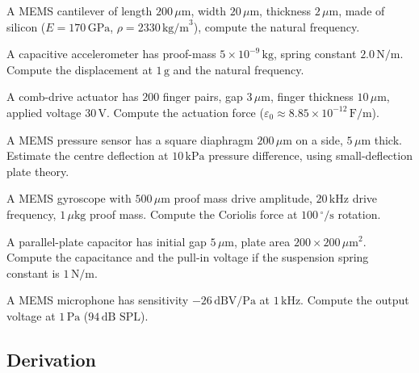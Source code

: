 \begin{exercise}
A MEMS cantilever of length $200\,\mu\text{m}$, width $20\,\mu\text{m}$, thickness $2\,\mu\text{m}$, made of silicon ($E = 170\,\text{GPa}$, $\rho = 2330\,\text{kg/m}^3$), compute the natural frequency.
\end{exercise}

\begin{exercise}
A capacitive accelerometer has proof-mass $5 \times 10^{-9}\,\text{kg}$, spring constant $2.0\,\text{N/m}$. Compute the displacement at $1\,\text{g}$ and the natural frequency.
\end{exercise}

\begin{exercise}
A comb-drive actuator has $200$ finger pairs, gap $3\,\mu\text{m}$, finger thickness $10\,\mu\text{m}$, applied voltage $30\,\text{V}$. Compute the actuation force ($\varepsilon_0 \approx 8.85 \times 10^{-12}\,\text{F/m}$).
\end{exercise}

\begin{exercise}
A MEMS pressure sensor has a square diaphragm $200\,\mu\text{m}$ on a side, $5\,\mu\text{m}$ thick. Estimate the centre deflection at $10\,\text{kPa}$ pressure difference, using small-deflection plate theory.
\end{exercise}

\begin{exercise}
A MEMS gyroscope with $500\,\mu\text{m}$ proof mass drive amplitude, $20\,\text{kHz}$ drive frequency, $1\,\mu\text{kg}$ proof mass. Compute the Coriolis force at $100\,^\circ/\text{s}$ rotation.
\end{exercise}

\begin{exercise}
A parallel-plate capacitor has initial gap $5\,\mu\text{m}$, plate area $200 \times 200\,\mu\text{m}^2$. Compute the capacitance and the pull-in voltage if the suspension spring constant is $1\,\text{N/m}$.
\end{exercise}

\begin{exercise}
A MEMS microphone has sensitivity $-26\,\text{dBV/Pa}$ at $1\,\text{kHz}$. Compute the output voltage at $1\,\text{Pa}$ ($94\,\text{dB SPL}$).
\end{exercise}

\subsection*{Derivation}

